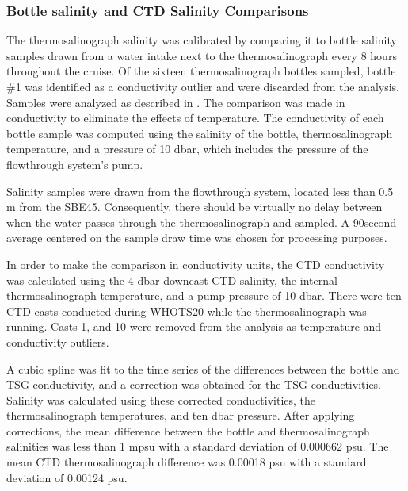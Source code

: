 \documentclass[a4paper,10pt,english,openany,oneside]{sphinxmanual}
\begin{document}
\subsubsection{Bottle salinity and CTD Salinity Comparisons}
\label{\detokenize{4_section:id10}}
\sphinxAtStartPar
The thermosalinograph salinity was calibrated by comparing it to bottle
salinity samples drawn from a water intake next to the thermosalinograph every
8 hours throughout the cruise. Of the sixteen thermosalinograph bottles
sampled, bottle \#1 was identified as a conductivity outlier and were discarded
from the analysis. Samples were analyzed as described in
{\hyperref[\detokenize{4_section:water-sampling-and-analysis}]{}}. The comparison was made in
conductivity to eliminate the effects of temperature. The conductivity of each
bottle sample was computed using the salinity of the bottle, thermosalinograph
temperature, and a pressure of 10 dbar, which includes the pressure of the
flow\sphinxhyphen{}through system’s pump.

\sphinxAtStartPar
Salinity samples were drawn from the flow\sphinxhyphen{}through system, located less than 0.5
m from the SBE\sphinxhyphen{}45. Consequently, there should be virtually no delay between
when the water passes through the thermosalinograph and sampled. A 90\sphinxhyphen{}second
average centered on the sample draw time was chosen for processing purposes.

\sphinxAtStartPar
In order to make the comparison in conductivity units, the CTD conductivity was
calculated using the 4 dbar downcast CTD salinity, the internal
thermosalinograph temperature, and a pump pressure of 10 dbar. There were ten
CTD casts conducted during WHOTS\sphinxhyphen{}20 while the thermosalinograph was running.
Casts 1, and 10 were removed from the analysis as temperature and conductivity
outliers.

\sphinxAtStartPar
A cubic spline was fit to the time series of the differences between the bottle
and TSG conductivity, and a correction was obtained for the TSG conductivities.
Salinity was calculated using these corrected conductivities, the
thermosalinograph temperatures, and ten dbar pressure. After applying
corrections, the mean difference between the bottle and thermosalinograph
salinities was less than 1 mpsu with a standard deviation of 0.000662 psu. The
mean CTD \sphinxhyphen{} thermosalinograph difference was \sphinxhyphen{}0.00018 psu with a standard
deviation of 0.00124 psu.
\end{document}
